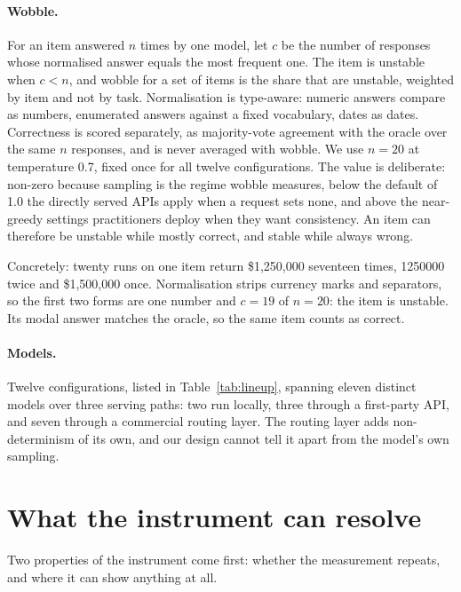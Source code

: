 \documentclass[11pt]{article}
\begin{document}
\paragraph{Wobble.} For an item answered $n$ times by one model, let $c$ be the number of responses
whose normalised answer equals the most frequent one. The item is unstable when $c < n$, and wobble
for a set of items is the share that are unstable, weighted by item and not by task. Normalisation
is type-aware: numeric answers compare as numbers, enumerated answers against a fixed vocabulary,
dates as dates. Correctness is scored separately, as majority-vote agreement with the oracle over
the same $n$ responses, and is never averaged with wobble. We use $n = 20$ at temperature 0.7, fixed
once for all twelve configurations. The value is deliberate: non-zero because sampling is the
regime wobble measures, below the default of 1.0 the directly served APIs apply when a request
sets none, and above the near-greedy settings practitioners deploy when they want consistency. An
item can therefore be unstable while mostly correct, and stable while always wrong.

Concretely: twenty runs on one item return \$1{,}250{,}000 seventeen times, 1250000 twice and
\$1{,}500{,}000 once. Normalisation strips currency marks and separators, so the first two forms
are one number and $c = 19$ of $n = 20$: the item is unstable. Its modal answer matches the
oracle, so the same item counts as correct.

\paragraph{Models.} Twelve configurations, listed in Table~\ref{tab:lineup}, spanning eleven
distinct models over three serving paths: two run locally, three through a first-party API, and
seven through a commercial routing layer. The routing layer adds non-determinism of its own, and
our design cannot tell it apart from the model's own sampling.

\section{What the instrument can resolve}
\label{sec:instrument}

Two properties of the instrument come first: whether the measurement repeats, and where it can
show anything at all.
\end{document}
